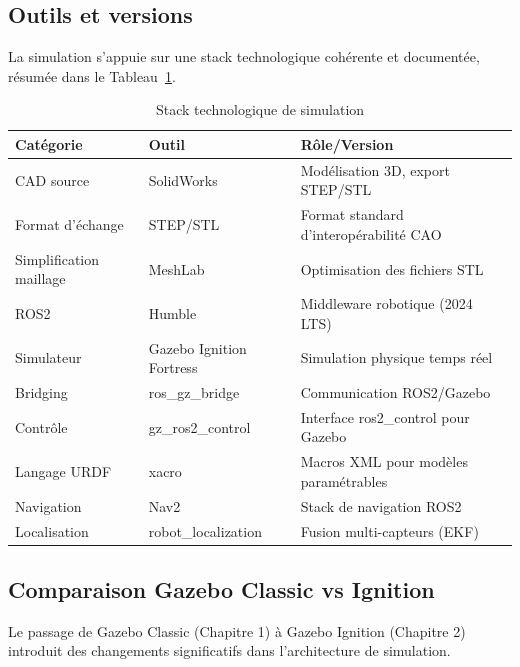 \documentclass[a4paper,12pt]{report}
\begin{document}
\subsection{Outils et versions}

La simulation s'appuie sur une stack technologique cohérente et documentée, résumée dans le Tableau~\ref{tab:tech_stack}.

\begin{table}[htbp]
\centering
\caption{Stack technologique de simulation}
\label{tab:tech_stack}
\begin{tabular}{@{}llp{6cm}@{}}
\toprule
\textbf{Catégorie} & \textbf{Outil} & \textbf{Rôle/Version} \\
\midrule
CAD source & SolidWorks & Modélisation 3D, export STEP/STL \\
Format d'échange & STEP/STL & Format standard d'interopérabilité CAO \\
Simplification maillage & MeshLab & Optimisation des fichiers STL \\
ROS2 & Humble & Middleware robotique (2024 LTS) \\
Simulateur & Gazebo Ignition Fortress & Simulation physique temps réel \\
Bridging & ros\_gz\_bridge & Communication ROS2/Gazebo \\
Contrôle & gz\_ros2\_control & Interface ros2_control pour Gazebo \\
Langage URDF & xacro & Macros XML pour modèles paramétrables \\
Navigation & Nav2 & Stack de navigation ROS2 \\
Localisation & robot\_localization & Fusion multi-capteurs (EKF) \\
\bottomrule
\end{tabular}
\end{table}

\subsection{Comparaison Gazebo Classic vs Ignition}

Le passage de Gazebo Classic (Chapitre 1) à Gazebo Ignition (Chapitre 2) introduit des changements significatifs dans l'architecture de simulation.
\end{document}
